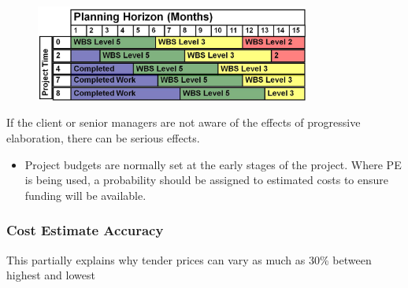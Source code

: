 \begin{frame}
\frametitle{}
\begin{figure}
	\centering
		\includegraphics[width = 9cm]{images/movingwindow.jpg}
	\label{fig:movingwindow}
\end{figure}
If the client or senior managers are not aware of the effects of progressive elaboration, there can be serious effects.
\begin{itemize}
	\item Project budgets are normally set at the early stages of the project.  Where PE is being used, a probability should be assigned to estimated costs to ensure funding will be available.
\end{itemize}
 
\end{frame}




\begin{frame}
\frametitle{Cost Estimate Accuracy}
\begin{table}
	\centering
		\caption{Kerzner (2009), P569}		
\end{table}	
This partially explains why tender prices can vary as much as 30\% between highest and lowest
\end{frame}





